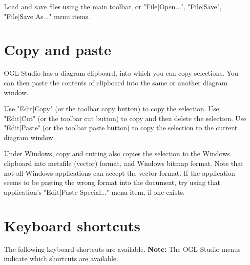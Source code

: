Load and save files using the main toolbar, or "File|Open...",
"File|Save", "File|Save As..." menu items.

\section{Copy and paste}

OGL Studio has a diagram clipboard, into which you can copy selections. You can then
paste the contents of clipboard into the same or another diagram window.

Use "Edit|Copy" (or the toolbar copy button) to copy the selection. Use "Edit|Cut" (or the toolbar cut button) to
copy and then delete the selection. Use "Edit|Paste" (or the toolbar paste button) to copy the selection to
the current diagram window.

Under Windows, copy and cutting also copies the selection to the Windows clipboard into metafile (vector)
format, and Windows bitmap format. Note that not all Windows applications can accept the vector format.
If the application seems to be pasting the wrong format into the document, try using that application's
"Edit|Paste Special..." menu item, if one exists.

\section{Keyboard shortcuts}

The following keyboard shortcuts are available. {\bf Note:} The OGL Studio menus indicate which shortcuts are
available.

\begin{twocollist}\itemsep=0pt
\end{twocollist}

